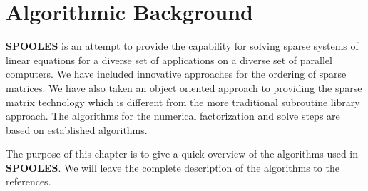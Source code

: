 \section{Algorithmic Background}
\label{section:background}
\par
{\bf SPOOLES} is an attempt to provide the capability for solving
sparse systems of linear equations for a diverse set of applications 
on a diverse set of parallel computers.  We have included innovative
approaches for the ordering of sparse matrices.  We have also taken
an object oriented approach to providing the sparse matrix technology
which is different from the more traditional subroutine library
approach.  The algorithms for the numerical factorization and
solve steps are based on established algorithms.
\par
The purpose of this chapter is to give a quick overview of the
algorithms used in {\bf SPOOLES}.  We will leave the complete
description of the algorithms to the references.
\par
